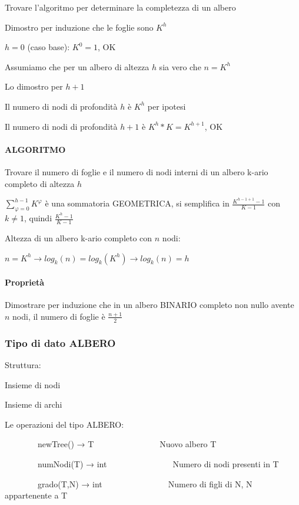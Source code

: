 \documentclass[11pt,a4paper,twoside,openright]{book}
\let\oldparagraph\paragraph
\renewcommand{\paragraph}[1]{\oldparagraph{#1}\mbox{}}
\begin{document}
{{{Trovare l'algoritmo per determinare la completezza di un albero}

{Dimostro per induzione che le foglie sono $K^h$}


{$h=0$ (caso base): $K^0=1$, OK}

{Assumiamo che per un albero di altezza $h$ sia vero che $n=K^h$}

{Lo dimostro per $h+1$}

{Il numero di nodi di profondità $h$ è $K^h$ per ipotesi}

{Il numero di nodi di profondità $h+1$ è $K^h*K=K^{h+1}$, OK}

\paragraph{ALGORITMO}

{Trovare il numero di foglie e il numero di nodi interni di un albero k-ario completo di altezza $h$}

{$\sum_{\varphi=0}^{h-1}{K^{\varphi}}$ è una sommatoria GEOMETRICA, si semplifica in $\frac{K^{h-1+1}-1}{K-1}$ con $k\neq 1$, quindi $\frac{K^h-1}{K-1}$}

{Altezza di un albero k-ario completo con $n$ nodi:}

$n=K^h \rightarrow log_k(n) = log_k(K^h) \rightarrow log_k(n) = h$

\paragraph{Proprietà}

{Dimostrare per induzione che in un albero BINARIO completo non nullo avente $n$ nodi, il numero di foglie è $\frac{n+1}{2}$}

\subsubsection{Tipo di dato ALBERO}

{Struttura:}

{Insieme di nodi}

{Insieme di archi}


{Le operazioni del tipo ALBERO:}


{~~~~~~~~newTree() → T~~~~~~~~~~~~~~~~Nuovo albero T}

{~~~~~~~~numNodi(T) → int~~~~~~~~~~~~~~~~Numero di nodi presenti in T}

{~~~~~~~~grado(T,N) → int~~~~~~~~~~~~~~~~Numero di figli di N, N
appartenente a T}

}}
\end{document}
